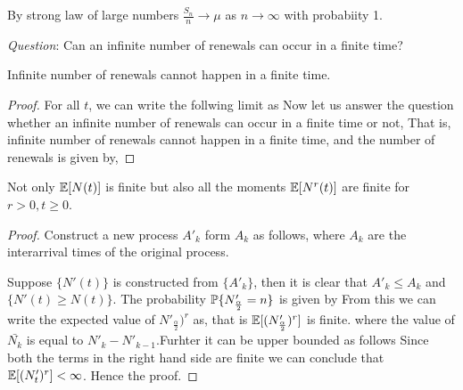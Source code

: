 \documentclass[all-lectures.tex]{subfiles}
\begin{document}
\begin{prop}
By strong law of large numbers $\frac{S_n}{n} \to \mu$ as $n \to \infty$ with probabiity 1.
\end{prop}


\textit{Question}: Can an infinite number of renewals can occur in a finite time?

\begin{prop}
Infinite number of renewals cannot happen in a finite time.
\end{prop}
\begin{proof}
For all $t$, we can write the follwing limit as
Now let us answer the question whether an infinite number of renewals can occur in a finite time or not,
That is, infinite number of renewals cannot happen in a finite time, and the number of renewals is given by,
\end{proof}

\begin{prop}
Not only $\E[N(t)]$ is finite but also all the moments $\E[N^r(t)]$ are finite for $r > 0, t \ge 0$.
\end{prop}

\begin{proof}
Construct a new process $A'_k$ form $A_k$ as follows,
where $A_k$ are the interarrival times of the original process.

Suppose $\{N'(t)\}$ is constructed from $\{A'_k\}$, then it is clear that $A'_k \le A_k$ and $\{N'(t) \ge N(t)\}$.
The probability $\P\{ N'_{\frac{\alpha}{2}} = n\}$ is given by
From this we can write the expected value of $N'_{\frac{\alpha}{2}})^r$ as,
that is $\E[(N'_{\frac{\alpha}{2}})^r]$ is finite.
\eq{
\E[(N'_t)^r] = \E \big{[}\sum_{k=1}^{\frac{t}{\alpha}+1} (\bar{N_k})^r \big{]}
}
where the value of $\bar{N_k}$ is equal to $N'_k-N'_{k-1}$.Furhter it can be upper bounded as follows
Since both the terms in the right hand side are finite we can conclude that $\E[(N'_t)^r] < \infty$. Hence the proof.
\end{proof}
\end{document}
